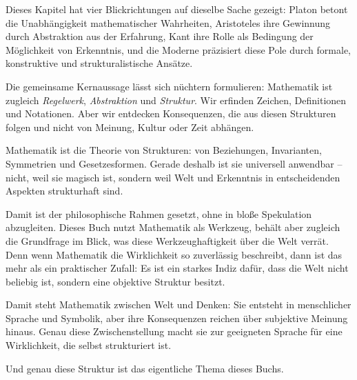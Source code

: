 \medskip

Dieses Kapitel hat vier Blickrichtungen auf dieselbe Sache gezeigt:
Platon betont die Unabhängigkeit mathematischer Wahrheiten,
Aristoteles ihre Gewinnung durch Abstraktion aus der Erfahrung,
Kant ihre Rolle als Bedingung der Möglichkeit von Erkenntnis,
und die Moderne präzisiert diese Pole
durch formale,
konstruktive
und strukturalistische Ansätze.

Die gemeinsame Kernaussage lässt sich nüchtern formulieren:
Mathematik ist zugleich \emph{Regelwerk},
\emph{Abstraktion}
und \emph{Struktur}.
Wir erfinden Zeichen,
Definitionen und Notationen.
Aber wir entdecken Konsequenzen,
die aus diesen Strukturen folgen
und nicht von Meinung,
Kultur oder Zeit abhängen.

\begin{NoteBox}
	\label{box:arbeitsdefinition}
	\small
	Mathematik ist die Theorie von Strukturen:
	von Beziehungen,
	Invarianten,
	Symmetrien
	und Gesetzesformen.
	Gerade deshalb ist sie universell anwendbar --
	nicht,
	weil sie magisch ist,
	sondern weil Welt und Erkenntnis
	in entscheidenden Aspekten strukturhaft sind.
\end{NoteBox}

Damit ist der philosophische Rahmen gesetzt,
ohne in bloße Spekulation abzugleiten.
Dieses Buch nutzt Mathematik als Werkzeug,
behält aber zugleich die Grundfrage im Blick,
was diese Werkzeughaftigkeit über die Welt verrät.
Denn wenn Mathematik die Wirklichkeit so zuverlässig beschreibt,
dann ist das mehr als ein praktischer Zufall:
Es ist ein starkes Indiz dafür,
dass die Welt nicht beliebig ist,
sondern eine objektive Struktur besitzt.

Damit steht Mathematik zwischen Welt und Denken:
Sie entsteht in menschlicher Sprache und Symbolik,
aber ihre Konsequenzen reichen über subjektive Meinung hinaus.
Genau diese Zwischenstellung macht sie zur geeigneten Sprache
für eine Wirklichkeit,
die selbst strukturiert ist.

Und genau diese Struktur ist das eigentliche Thema dieses Buchs.
